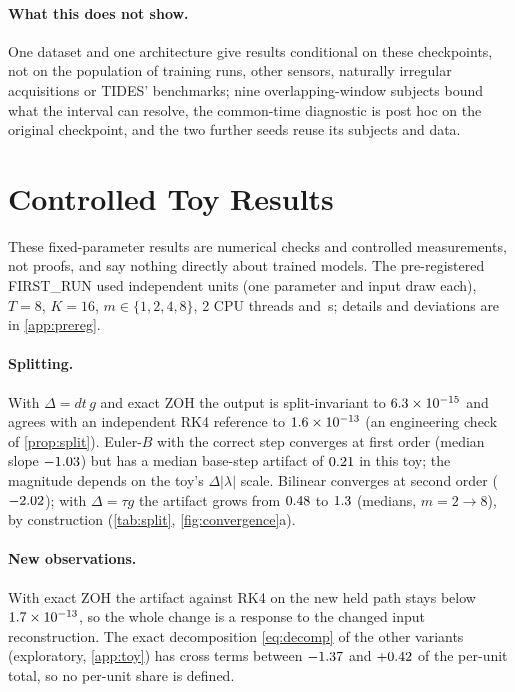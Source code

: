 \documentclass{article}
\theoremstyle{plain}
\theoremstyle{definition}
\theoremstyle{remark}
\begin{document}
\paragraph{What this does not show.}
One dataset and one architecture give results conditional on these checkpoints, not on the population of training runs, other sensors, naturally irregular acquisitions or TIDES' benchmarks; nine overlapping-window subjects bound what the interval can resolve, the common-time diagnostic is post hoc on the original checkpoint, and the two further seeds reuse its subjects and data.

\section{Controlled Toy Results}
\label{sec:toy}

These fixed-parameter results are numerical checks and controlled measurements, not proofs, and say nothing directly about trained models.
The pre-registered FIRST\_RUN used \NunitsPrimary{} independent units (one parameter and input draw each), $T{=}8$, $K{=}16$, $m\in\{1,2,4,8\}$, 2 CPU threads and \FirstRunSeconds\,s; details and deviations are in \cref{app:prereg}.

\paragraph{Splitting.}
With $\Delta{=}dt\,g$ and exact ZOH the output is split-invariant to $6.3\times10^{-15}$ and agrees with an independent RK4 reference to $1.6\times10^{-13}$ (an engineering check of \cref{prop:split}).
Euler-$B$ with the correct step converges at first order (median slope $-1.03$) but has a median base-step artifact of $0.21$ in this toy; the magnitude depends on the toy's $\Delta|\lambda|$ scale.
Bilinear converges at second order ($-2.02$); with $\Delta{=}\tau g$ the artifact grows from $0.48$ to $1.3$ (medians, $m{=}2\to8$), by construction (\cref{tab:split}, \cref{fig:convergence}a).



\paragraph{New observations.}
With exact ZOH the artifact against RK4 on the new held path stays below $1.7\times10^{-13}$, so the whole change is a response to the changed input reconstruction.
The exact decomposition \eqref{eq:decomp} of the other variants (exploratory, \cref{app:toy}) has cross terms between $-1.37$ and $+0.42$ of the per-unit total, so no per-unit share is defined.
\end{document}

